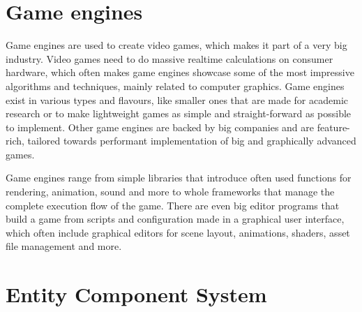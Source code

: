\label{chap:introduction}

\section*{Game engines}

Game engines are used to create video games, which makes it part of a very big industry. Video games need to do massive realtime calculations on consumer hardware, which often makes game engines showcase some of the most impressive algorithms and techniques, mainly related to computer graphics. Game engines exist in various types and flavours, like smaller ones that are made for academic research or to make lightweight games as simple and straight-forward as possible to implement. Other game engines are backed by big companies and are feature-rich, tailored towards performant implementation of big and graphically advanced games.

Game engines range from simple libraries that introduce often used functions for rendering, animation, sound and more to whole frameworks that manage the complete execution flow of the game. There are even big editor programs that build a game from scripts and configuration made in a graphical user interface, which often include graphical editors for scene layout, animations, shaders, asset file management and more.

\section*{Entity Component System}

